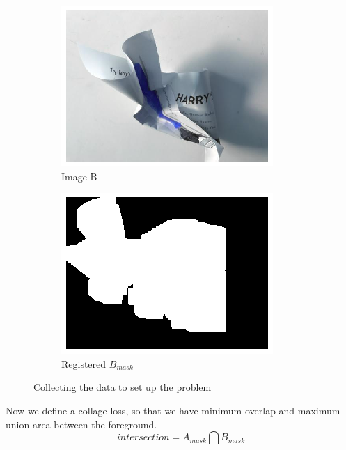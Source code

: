 \documentclass{article}
\begin{document}
\begin{figure}[h!]
  \begin{subfigure}[b]{0.25\linewidth}
    \includegraphics[width=\linewidth]{data/images/04_Learned_Collage/original_target.png}
    \caption{Image B}
  \end{subfigure}
  \begin{subfigure}[b]{0.25\linewidth}
    \includegraphics[width=\linewidth]{data/images/04_Learned_Collage/target_mask.png}
    \caption{Registered $B_{mask}$}
  \end{subfigure}
  \caption{Collecting the data to set up the problem}
  \label{fig:learning_collages}
\end{figure}


Now we define a collage loss, so that we have minimum overlap and maximum union area between the foreground. 
\begin{equation}
intersection = A_{mask} \bigcap B_{mask}
\end{equation}
\end{document}
